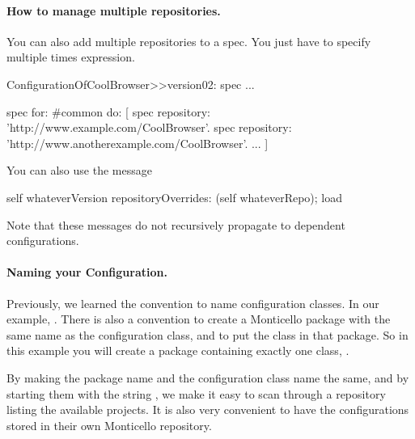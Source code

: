 \documentclass[a4paper,10pt,twoside]{book}
\begin{document}
\paragraph{How to manage multiple repositories.}
You can also add multiple repositories to a spec. You just have to specify multiple times  expression.

\begin{code}{}
ConfigurationOfCoolBrowser>>version02: spec 
		...
       
		spec for: #common do: [
			spec repository: 'http://www.example.com/CoolBrowser'.
			spec repository: 'http://www.anotherexample.com/CoolBrowser'.
			...
			]
\end{code}

You can also use the message 

\begin{code}{}
self whateverVersion repositoryOverrides: (self whateverRepo); load
\end{code}

Note that these messages do not recursively propagate to dependent configurations.


\paragraph{Naming your Configuration.}

Previously, we learned the convention to name configuration classes. In our example, . There is also a convention to create a Monticello package with the same name as the configuration class, and to put the class in that package. So in this example you will create a package  containing exactly one class, . 

By making the package name and the configuration class name the same, and by starting them with the string ,  we make it easy to scan through a repository listing the available projects. It is also very convenient to have the configurations stored in their own Monticello repository. 
\end{document}
